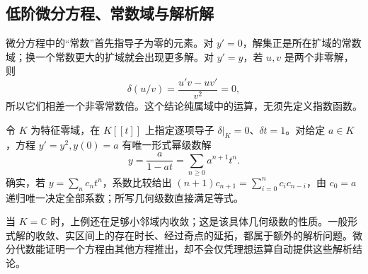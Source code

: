\subsection{低阶微分方程、常数域与解析解}
\label{b3:subsec:E02:03}

微分方程中的“常数”首先指导子为零的元素。对 \(y'=0\)，解集正是所在扩域的常数域；换一个常数更大的扩域就会出现更多解。对 \(y'=y\)，若 \(u,v\) 是两个非零解，则
\[
	\delta(u/v)=\frac{u'v-uv'}{v^2}=0,
\]
所以它们相差一个非零常数倍。这个结论纯属域中的运算，无须先定义指数函数。

\begin{example}\label{b3:exm:formal-riccati}
	令 \(K\) 为特征零域，在 \(K[\![t]\!]\) 上指定逐项导子 \(\delta|_K=0\)、\(\delta t=1\)。对给定 \(a\in K\)，方程 \(y'=y^2,y(0)=a\) 有唯一形式幂级数解
	\[
		y=\frac{a}{1-at}=\sum_{n\ge0}a^{n+1}t^n.
	\]
	确实，若 \(y=\sum_nc_nt^n\)，系数比较给出 \((n+1)c_{n+1}=\sum_{i=0}^nc_ic_{n-i}\)，由 \(c_0=a\) 递归唯一决定全部系数；所写几何级数直接满足等式。
\end{example}

当 \(K=\mathbb C\) 时，上例还在足够小邻域内收敛；这是该具体几何级数的性质。一般形式解的收敛、实区间上的存在时长、经过奇点的延拓，都属于额外的解析问题。微分代数能证明一个方程由其他方程推出，却不会仅凭理想运算自动提供这些解析结论。
